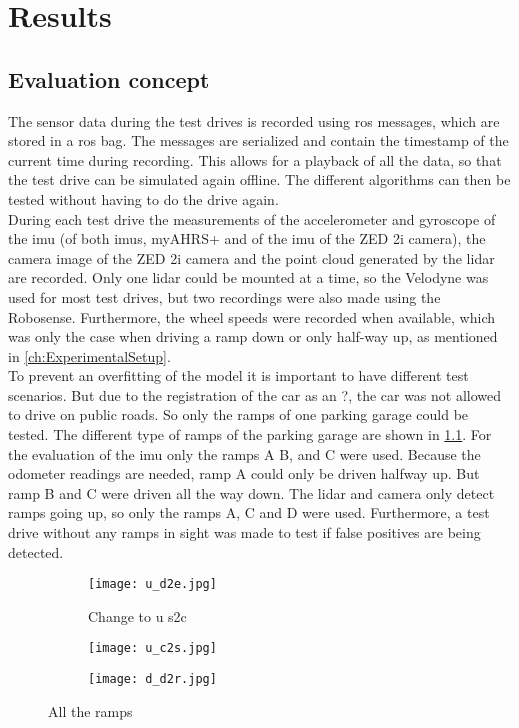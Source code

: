 \chapter{Results}
\label{ch:Results}

\section{Evaluation concept}
The sensor data during the test drives is recorded using \gls{ros} messages, which are stored in a \gls{ros} bag.
The messages are serialized and contain the timestamp of the current time during recording.
This allows for a playback of all the data, so that the test drive can be simulated again offline.
The different algorithms can then be tested without having to do the drive again.\\
During each test drive the measurements of the accelerometer and gyroscope of the \gls{imu} (of both \gls{imu}s, myAHRS+ and of the \gls{imu} of the ZED 2i camera), the camera image of the ZED 2i camera and the point cloud generated by the \gls{lidar} are recorded.
Only one \gls{lidar} could be mounted at a time, so the Velodyne was used for most test drives, but two recordings were also made using the Robosense.
Furthermore, the wheel speeds were recorded when available, which was only the case when driving a ramp down or only half-way up, as mentioned in \cref{ch:ExperimentalSetup}.\\
To prevent an overfitting of the model it is important to have different test scenarios.
But due to the registration of the car as an ?, the car was not allowed to drive on public roads.
So only the ramps of one parking garage could be tested.
The different type of ramps of the parking garage are shown in \cref{fig:all_ramps}.
For the evaluation of the \gls{imu} only the ramps A B, and C were used.
Because the odometer readings are needed, ramp A could only be driven halfway up.
But ramp B and C were driven all the way down.
The \gls{lidar} and camera only detect ramps going up, so only the ramps A, C and D were used.
Furthermore, a test drive without any ramps in sight was made to test if false positives are being detected.


\begin{figure}
	\begin{subfigure}{.3\linewidth}
		\centering
		\texttt{[image: u\_d2e.jpg]}
		\caption{Change to u s2c}
	\end{subfigure}
	\hfill
	\begin{subfigure}{.3\linewidth}
		\centering
		\texttt{[image: u\_c2s.jpg]}
		\caption{}\textbf{}
	\end{subfigure}
	\hfill
	\begin{subfigure}{.3\linewidth}
		\centering
		\texttt{[image: d\_d2r.jpg]}
		\caption{}
	\end{subfigure}
	\caption{All the ramps}
	\label{fig:all_ramps}
\end{figure}

